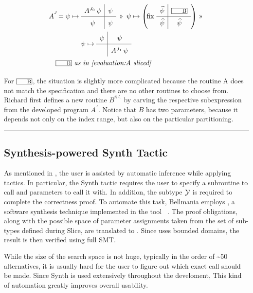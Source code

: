 \begin{equation}
  \renewcommand\arraystretch{1.5}
  \begin{array}{@{} r @{} l @{}}
    A^{^J}\! = \psi\mapsto{} & \quadrants{A^{J_0}\,\psi}{\psi}{\psi}{\psi} ~ \applt 
       ~\psi \mapsto \left(\!\fix\, \quadrants{\lifted\psi}{\lbox B}{\lifted\psi}{\lifted\psi}\right) \applt \\[5mm]
       & \psi \mapsto \quadrants{\psi}{\psi}{}{A^{J_1}\,\psi} \\
    \lspan2{
     \quad
     \lbox B \textit{ as in \Cref{evaluation:A sliced}}
    }
  \end{array}
  \label{evaluation:A stratified twice}
\end{equation}

For $\lbox B$, the situation is slightly more complicated because the routine
A does not match the specification and there are no other routines to choose from.
Richard first defines a new routine $B^{^{J_0J_1}}$ by carving the respective
subexpression from the developed program $A^{^J}$.
Notice that $B$ has two parameters, because it depends not only on the index
range, but also on the particular partitioning.

\medskip
\hrule

\subsection{Synthesis-powered {\sf Synth} Tactic}
\label{tactics:synthesis}

As mentioned in , the user is assisted by automatic
inference while applying tactics. In particular, the {\sf Synth} tactic requires
the user to specify a subroutine to call and parameters to call it with.
In addition, the subtype $\mathcal{Y}$ is required to complete the correctness proof.
To automate this task, Bellmania employs {\cegis}, a software synthesis technique
implemented in the tool {\Sketch}~\cite{STTT13/Solar-Lezama}. The proof obligations, along with the possible
space of parameter assignments taken from the set of sub-types defined during
{\sf Slice}, are translated to {\Sketch}. Since {\Sketch} uses bounded domains,
the result is then verified using full SMT.

While the size of the search space is not huge, typically in the order of \textasciitilde50
alternatives, it is usually hard for the user to figure out which exact call
should be made. Since {\sf Synth} is used extensively throughout the develoment,
This kind of automation greatly improves overall usability.

